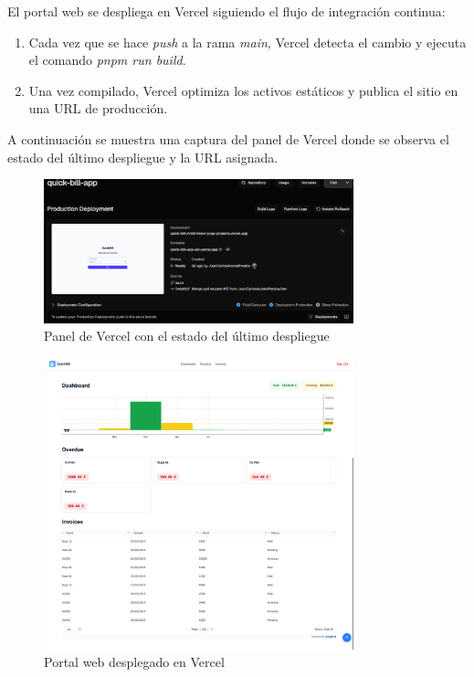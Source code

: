 \begin{large}
	
El portal web se despliega en Vercel siguiendo el flujo de integración continua:

\begin{enumerate}
  \item Cada vez que se hace \emph{push} a la rama \textit{main}, Vercel detecta el cambio y ejecuta el comando \textit{pnpm run build}.
  \item Una vez compilado, Vercel optimiza los activos estáticos y publica el sitio en una URL de producción.
\end{enumerate}

A continuación se muestra una captura del panel de Vercel donde se observa el estado del último despliegue y la URL asignada.

\begin{figure}[H]
\centering
\includegraphics[width=0.8\textwidth]{Ilustraciones/vercel_deploy.png}
\caption{Panel de Vercel con el estado del último despliegue}
\label{fig:vercel_deploy}
\end{figure}

\begin{figure}[H]
\centering
\includegraphics[width=0.8\textwidth]{Ilustraciones/vercel_deployed.png}
\caption{Portal web desplegado en Vercel}
\label{fig:vercel_deployed}
\end{figure}


\end{large}
